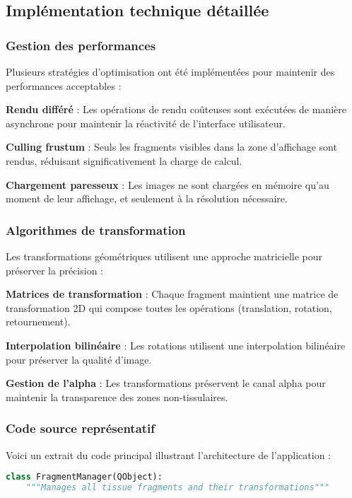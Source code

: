 \documentclass[12pt,a4paper]{report}
\begin{document}
\begin{}
\begin{}
\begin{}
\begin{}
\subsection{Implémentation technique détaillée}

\subsubsection{Gestion des performances}

Plusieurs stratégies d'optimisation ont été implémentées pour maintenir des performances acceptables :

\textbf{Rendu différé} : Les opérations de rendu coûteuses sont exécutées de manière asynchrone pour maintenir la réactivité de l'interface utilisateur.

\textbf{Culling frustum} : Seuls les fragments visibles dans la zone d'affichage sont rendus, réduisant significativement la charge de calcul.

\textbf{Chargement paresseux} : Les images ne sont chargées en mémoire qu'au moment de leur affichage, et seulement à la résolution nécessaire.

\subsubsection{Algorithmes de transformation}

Les transformations géométriques utilisent une approche matricielle pour préserver la précision :

\textbf{Matrices de transformation} : Chaque fragment maintient une matrice de transformation 2D qui compose toutes les opérations (translation, rotation, retournement).

\textbf{Interpolation bilinéaire} : Les rotations utilisent une interpolation bilinéaire pour préserver la qualité d'image.

\textbf{Gestion de l'alpha} : Les transformations préservent le canal alpha pour maintenir la transparence des zones non-tissulaires.

\subsubsection{Code source représentatif}

Voici un extrait du code principal illustrant l'architecture de l'application :

\begin{lstlisting}[language=Python, caption=Gestionnaire de fragments - Classe principale]
class FragmentManager(QObject):
    """Manages all tissue fragments and their transformations"""
    

\end{lstlisting}
\end{}
\end{}
\end{}
\end{}
\end{document}
